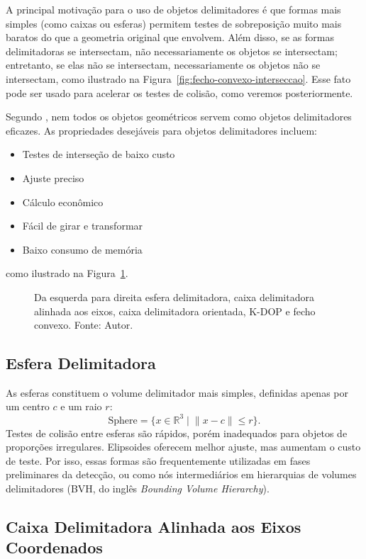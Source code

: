 A principal motivação para o uso de objetos delimitadores é que formas mais simples (como caixas ou esferas) permitem testes de sobreposição muito mais baratos do que a geometria original que envolvem. Além disso, se as formas delimitadoras se intersectam, não necessariamente os objetos se intersectam; entretanto, se elas não se intersectam, necessariamente os objetos não se intersectam, como ilustrado na Figura~\ref{fig:fecho-convexo-interseccao}. Esse fato pode ser usado para acelerar os testes de colisão, como veremos posteriormente. 

Segundo , nem todos os objetos geométricos servem como objetos delimitadores eficazes. As propriedades desejáveis para objetos delimitadores incluem:
\begin{itemize}
	\item Testes de interseção de baixo custo
	\item Ajuste preciso
	\item Cálculo econômico
	\item Fácil de girar e transformar
	\item Baixo consumo de memória
\end{itemize}
como ilustrado na Figura~\ref{fig:formas-fecho-convexo}.

\begin{figure}[htb]
	\centering
	
	\caption{Da esquerda para direita esfera delimitadora, caixa delimitadora alinhada aos eixos, caixa delimitadora orientada, K-DOP e fecho convexo. Fonte: Autor.}
	\label{fig:formas-fecho-convexo}
\end{figure}

\subsection*{Esfera Delimitadora}

As esferas constituem o volume delimitador mais simples, definidas apenas por um centro $c$ e um raio $r$:
$$
\text{Sphere} = \{ x \in \mathbb{R}^3 \; | \; \|x - c\| \le r \}.
$$
Testes de colisão entre esferas são rápidos, porém inadequados para objetos de proporções irregulares. Elipsoides oferecem melhor ajuste, mas aumentam o custo de teste. Por isso, essas formas são frequentemente utilizadas em fases preliminares da detecção, ou como nós intermediários em hierarquias de volumes delimitadores (BVH, do inglês \textit{Bounding Volume Hierarchy}).

\subsection*{Caixa Delimitadora Alinhada aos Eixos Coordenados}

